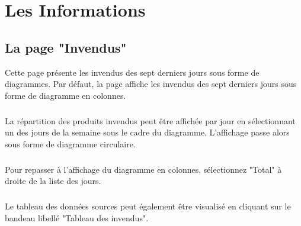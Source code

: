 \chapter{Les Informations}

\section{La page "Invendus"}
Cette page présente les invendus des sept derniers jours sous forme de
diagrammes.
Par défaut, la page affiche les invendus des sept derniers jours sous forme
de diagramme en colonnes.

\paragraph{}
La répartition des produits invendus peut être
affichée par jour en sélectionnant un des jours de la semaine sous le cadre
du diagramme. L'affichage passe alors sous forme de diagramme circulaire.

\paragraph{}
Pour repasser à l'affichage du diagramme en colonnes, sélectionnez "Total" à
droite de la liste des jours.

\paragraph{}
Le tableau des données sources peut également être visualisé en cliquant sur le
bandeau libellé "Tableau des invendus".

